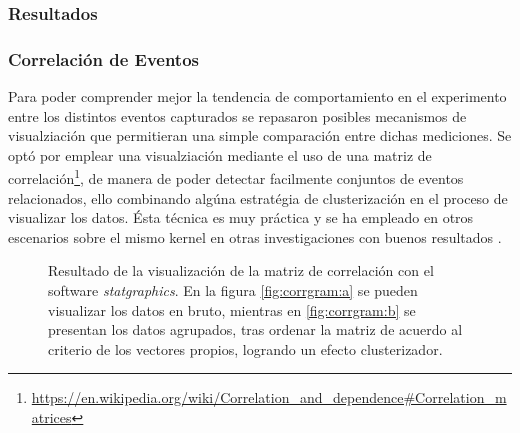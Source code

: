 \subsubsection{Resultados}

\subsubsection{Correlación de Eventos}
Para poder comprender mejor la tendencia de comportamiento en el experimento entre los distintos eventos capturados se repasaron posibles mecanismos de visualziación que permitieran una simple comparación entre dichas mediciones. Se optó por emplear una visualziación mediante el uso de una matriz de correlación\footnote{\url{https://en.wikipedia.org/wiki/Correlation_and_dependence#Correlation_matrices}}, de manera de poder detectar facilmente conjuntos de eventos relacionados, ello combinando algúna estratégia de clusterización en el proceso de visualizar los datos. Ésta técnica es muy práctica y se ha empleado en otros escenarios sobre el mismo kernel en otras investigaciones con buenos resultados \cite{paper:clusteringKernel}.

\begin{figure}[h!]
	\centering
	\hspace*{\fill}
	\hfill
	\caption{Resultado de la visualización de la matriz de correlación con el software \emph{statgraphics}. En la figura \ref{fig:corrgram:a} se pueden visualizar los datos en bruto, mientras en \ref{fig:corrgram:b} se presentan los datos agrupados, tras ordenar la matriz de acuerdo al criterio de los vectores propios, logrando un efecto clusterizador.}
	\label{fig:corrmatrix}
	\hspace*{\fill}
\end{figure}

